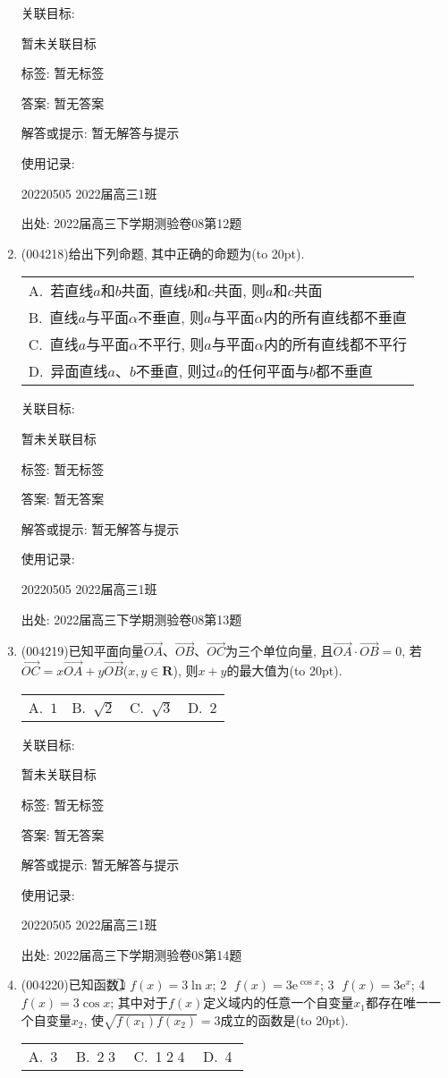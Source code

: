 \documentclass[10pt,a4paper]{article}
\newcommand{\bracket}[1]{(\hbox to #1pt{})}
\newcommand{\onech}[4]{\par\begin{tabular}{p{.9\textwidth}}
A.~#1\\
B.~#2\\
C.~#3\\
D.~#4
\end{tabular}}
\newcommand{\fourch}[4]{\par\begin{tabular}{p{.23\textwidth}p{.23\textwidth}p{.23\textwidth}p{.23\textwidth}}
A.~#1 &B.~#2& C.~#3& D.~#4
\end{tabular}}
\begin{document}
\begin{enumerate}[1.]
关联目标:

暂未关联目标



标签: 暂无标签

答案: 暂无答案

解答或提示: 暂无解答与提示

使用记录:

20220505	2022届高三1班	


出处: 2022届高三下学期测验卷08第12题
\item { (004218)}给出下列命题, 其中正确的命题为\bracket{20}.
\onech{若直线$a$和$b$共面, 直线$b$和$c$共面, 则$a$和$c$共面}{直线$a$与平面$\alpha$不垂直, 则$a$与平面$\alpha$内的所有直线都不垂直}{直线$a$与平面$\alpha$不平行, 则$a$与平面$\alpha$内的所有直线都不平行}{异面直线$a$、$b$不垂直, 则过$a$的任何平面与$b$都不垂直}


关联目标:

暂未关联目标



标签: 暂无标签

答案: 暂无答案

解答或提示: 暂无解答与提示

使用记录:

20220505	2022届高三1班	


出处: 2022届高三下学期测验卷08第13题
\item { (004219)}已知平面向量$\overrightarrow{OA}$、$\overrightarrow{OB}$、$\overrightarrow{OC}$为三个单位向量, 且$\overrightarrow{OA}\cdot \overrightarrow{OB}=0$, 若$\overrightarrow{OC}=x\overrightarrow{OA}+y\overrightarrow{OB}$($x,y\in \mathbf{R}$), 则$x+y$的最大值为\bracket{20}.
\fourch{$1$}{$\sqrt 2$}{$\sqrt 3$}{$2$}


关联目标:

暂未关联目标



标签: 暂无标签

答案: 暂无答案

解答或提示: 暂无解答与提示

使用记录:

20220505	2022届高三1班	


出处: 2022届高三下学期测验卷08第14题
\item { (004220)}已知函数\textcircled{1} $f(x)=3\ln x$; \textcircled{2} $f(x)=3\mathrm{e}^{\cos x}$; \textcircled{3} $f(x)=3\mathrm{e}^x$; \textcircled{4} $f(x)=3\cos x$; 其中对于$f(x)$定义域内的任意一个自变量$x_1$都存在唯一一个自变量$x_2$, 使$\sqrt{f(x_1)f(x_2)}=3$成立的函数是\bracket{20}.
\fourch{\textcircled{3}}{\textcircled{2}\textcircled{3}}{\textcircled{1}\textcircled{2}\textcircled{4}}{\textcircled{4}}



\end{enumerate}
\end{document}
